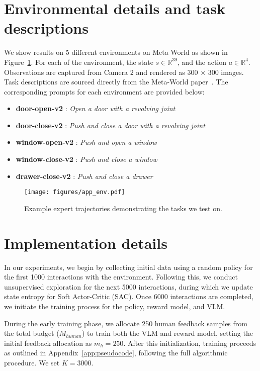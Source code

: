 \section{Environmental details and task descriptions}
\label{app:env}
We show results on 5 different environments on Meta World as shown in Figure~\ref{fig:env}. For each of the environment, the state $s\in\mathbb{R}^{39}$, and the action $a\in\mathbb{R}^4$. Observations are captured from Camera 2 and rendered as 300 × 300 images. Task descriptions are sourced directly from the Meta-World paper~\cite{yu2020meta}. The corresponding prompts for each environment are provided below:
\begin{itemize}
    \item \textbf{door-open-v2} : \textit{Open a door with a revolving joint}
    \item \textbf{door-close-v2} : \textit{Push and close a door with a revolving joint}
    \item \textbf{window-open-v2} : \textit{Push and open a window}
    \item \textbf{window-close-v2} : \textit{Push and close a window}
    \item \textbf{drawer-close-v2} : \textit{Push and close a drawer}
\end{itemize}
\begin{figure}[H]
    \centering
    \texttt{[image: figures/app\_env.pdf]}
    \caption{Example expert trajectories demonstrating the tasks we test on.}
    \label{fig:env}
\end{figure}


\section{Implementation details}
\label{app:impl}
In our experiments, we begin by collecting initial data using a random policy for the first 1000 interactions with the environment. Following this, we conduct unsupervised exploration for the next 5000 interactions, during which we update state entropy for Soft Actor-Critic (SAC). Once 6000 interactions are completed, we initiate the training process for the policy, reward model, and VLM.

During the early training phase, we allocate 250 human feedback samples from the total budget ($M_{human}$) to train both the VLM and reward model, setting the initial feedback allocation as $m_h = 250$. After this initialization, training proceeds as outlined in Appendix~\ref{app:pseudocode}, following the full algorithmic procedure. We set $K=3000$. 

